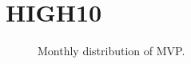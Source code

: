 \newpage

\section{HIGH10}
%

\begin{figure}[H]
	\begin{subfigmatrix}{2}
	\end{subfigmatrix}
	\caption{Monthly distribution of MVP.}
	\label{fig:totalRiskMVP}
\end{figure}



